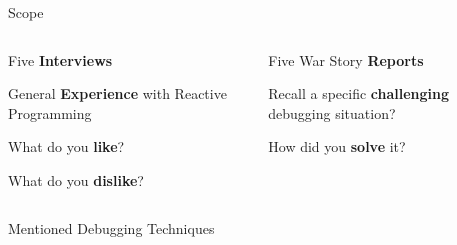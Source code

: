 \documentclass[aspectratio=169]{beamer}
\begin{document}
\begin{frame}[fragile]{Scope}
    \begin{columns}[T]
        \begin{column}{.4\linewidth}
            
            \begin{vfilleditems}
                \item Five \textbf{Interviews}\vspace{1em}
                \item General \textbf{Experience} with Reactive Programming\vspace{0.5em}
                \item What do you \textbf{like}?\vspace{0.5em}
                \item What do you \textbf{dislike}?
        	\end{vfilleditems}
        \end{column}
        \begin{column}{.4\linewidth}
            \begin{vfilleditems}
                \item Five War Story \textbf{Reports}\vspace{1em}
        		\item Recall a specific \textbf{challenging} debugging situation?\vspace{0.5em}
        		\item How did you \textbf{solve} it?
        	\end{vfilleditems}
        \end{column}
    \end{columns}
\end{frame}


\begin{frame}[fragile]{Mentioned Debugging Techniques}
    \begin{figure}
        \centering
    \end{figure}
\end{frame}
\end{document}
